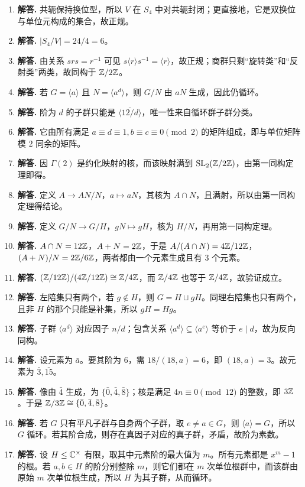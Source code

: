 \begin{enumerate}[label=\textbf{\arabic*.}, leftmargin=*, itemsep=1em]
\item \textbf{解答.} 共轭保持换位型，所以 $V$ 在 $S_4$ 中对共轭封闭；更直接地，它是双换位与单位元构成的集合，故正规。
\item \textbf{解答.} $|S_4/V|=24/4=6$。
\item \textbf{解答.} 由关系 $srs=r^{-1}$ 可见 $s\langle r\rangle s^{-1}=\langle r\rangle$，故正规；商群只剩“旋转类”和“反射类”两类，故同构于 $\mathbb{Z}/2\mathbb{Z}$。
\item \textbf{解答.} 若 $G=\langle a\rangle$ 且 $N=\langle a^d\rangle$，则 $G/N$ 由 $aN$ 生成，因此仍循环。
\item \textbf{解答.} 阶为 $d$ 的子群只能是 $\langle\overline{12/d}\rangle$，唯一性来自循环群子群分类。
\item \textbf{解答.} 它由所有满足 $a\equiv d\equiv1,b\equiv c\equiv0\pmod2$ 的矩阵组成，即与单位矩阵模 $2$ 同余的矩阵。
\item \textbf{解答.} 因 $\Gamma(2)$ 是约化映射的核，而该映射满到 $\mathrm{SL}_2(\mathbb{Z}/2\mathbb{Z})$，由第一同构定理即得。
\item \textbf{解答.} 定义 $A\to AN/N$，$a\mapsto aN$，其核为 $A\cap N$，且满射，所以由第一同构定理得结论。
\item \textbf{解答.} 定义 $G/N\to G/H$，$gN\mapsto gH$，核为 $H/N$，再用第一同构定理。
\item \textbf{解答.} $A\cap N=12\mathbb{Z}$，$A+N=2\mathbb{Z}$，于是 $A/(A\cap N)=4\mathbb{Z}/12\mathbb{Z}$，$ (A+N)/N=2\mathbb{Z}/6\mathbb{Z}$，两者都由一个元素生成且有 $3$ 个元素。
\item \textbf{解答.} $(\mathbb{Z}/12\mathbb{Z})/(4\mathbb{Z}/12\mathbb{Z})\cong \mathbb{Z}/4\mathbb{Z}$，而 $\mathbb{Z}/4\mathbb{Z}$ 也等于 $\mathbb{Z}/4\mathbb{Z}$，故验证成立。
\item \textbf{解答.} 左陪集只有两个，若 $g\notin H$，则 $G=H\sqcup gH$。同理右陪集也只有两个，且非 $H$ 的那个只能是补集，所以 $gH=Hg$。
\item \textbf{解答.} 子群 $\langle a^d\rangle$ 对应因子 $n/d$；包含关系 $\langle a^d\rangle\subseteq\langle a^e\rangle$ 等价于 $e\mid d$，故为反向同构。
\item \textbf{解答.} 设元素为 $\bar a$。要其阶为 $6$，需 $18/(18,a)=6$，即 $(18,a)=3$。故元素为 $\bar3,\bar{15}$。
\item \textbf{解答.} 像由 $\bar4$ 生成，为 $\{\bar0,\bar4,\bar8\}$；核是满足 $4n\equiv0\pmod{12}$ 的整数，即 $3\mathbb{Z}$。于是 $\mathbb{Z}/3\mathbb{Z}\cong\{\bar0,\bar4,\bar8\}$。
\item \textbf{解答.} 若 $G$ 只有平凡子群与自身两个子群，取 $e\ne a\in G$，则 $\langle a\rangle=G$，所以 $G$ 循环。若其阶合成，则存在真因子对应的真子群，矛盾，故阶为素数。
\item \textbf{解答.} 设 $H\le\mathbb{C}^\times$ 有限，取其中元素阶的最大值为 $m$。所有元素都是 $x^m-1$ 的根。若 $a,b\in H$ 的阶分别整除 $m$，则它们都在 $m$ 次单位根群中，而该群由原始 $m$ 次单位根生成，所以 $H$ 为其子群，从而循环。

\end{enumerate}
